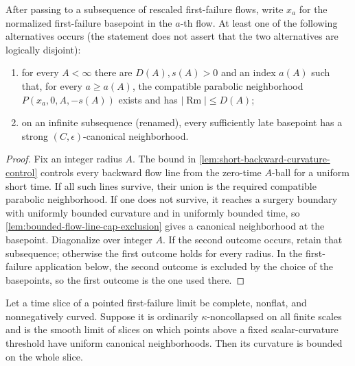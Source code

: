 \begin{lemma}
\label{lem:backward-parabolic-neighborhood-dichotomy}
\notready
After passing to a subsequence of rescaled first-failure flows, write $x_a$
for the normalized first-failure basepoint in the $a$-th flow.  At least one
of the following alternatives occurs (the statement does not assert that the
two alternatives are logically disjoint):
\begin{enumerate}
\item for every $A<\infty$ there are $D(A),s(A)>0$ and an index $a(A)$ such
      that, for every $a\ge a(A)$, the compatible parabolic neighborhood
      $P(x_a,0,A,-s(A))$ exists and has
      $|\operatorname{Rm}|\le D(A)$;
\item on an infinite subsequence (renamed), every sufficiently late basepoint
      has a strong $(C,\epsilon)$-canonical neighborhood.
\end{enumerate}
\end{lemma}

\begin{proof}
Fix an integer radius $A$.  The bound in
\ref{lem:short-backward-curvature-control} controls every backward flow line
from the zero-time $A$-ball for a uniform short time.  If all such lines
survive, their union is the required compatible parabolic neighborhood.  If
one does not survive, it reaches a surgery boundary with uniformly bounded
curvature and in uniformly bounded time, so
\ref{lem:bounded-flow-line-cap-exclusion} gives a canonical neighborhood at
the basepoint.  Diagonalize over integer $A$.  If the second outcome occurs,
retain that subsequence; otherwise the first outcome holds for every radius.
In the first-failure application below, the second outcome is excluded by the
choice of the basepoints, so the first outcome is the one used there.
\end{proof}

\begin{lemma}
\label{lem:first-failure-limit-slice-bounded-curvature}
\notready
Let a time slice of a pointed first-failure limit be complete, nonflat, and
nonnegatively curved.  Suppose it is ordinarily $\kappa$-noncollapsed on all
finite scales and is the smooth limit of slices on which points above a fixed
scalar-curvature threshold have uniform canonical neighborhoods.  Then its
curvature is bounded on the whole slice.
\end{lemma}

